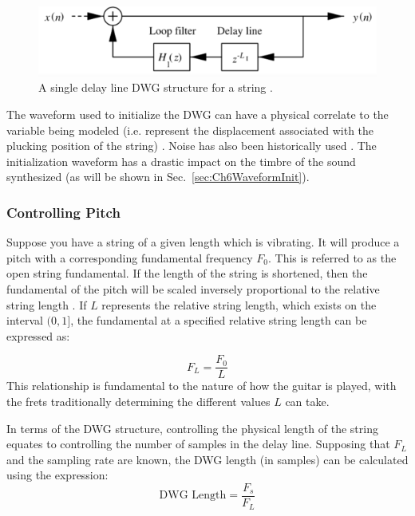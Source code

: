 \documentclass[main.tex]{subfiles}
\begin{document}
\begin{figure}[h]
    \centering
    \includegraphics[scale=1]{./images/diagrams/SDLModel.png}
    \caption{A single delay line DWG structure for a string .}
    \label{fig:SDLModel}
\end{figure}

The waveform used to initialize the DWG can have a physical correlate to
the variable being modeled (i.e. represent the displacement associated with the plucking position of the string) . Noise has also been historically used . The initialization waveform has a drastic impact on the timbre of the sound synthesized (as will be shown in Sec.~\ref{sec:Ch6WaveformInit}).

\subsubsection{Controlling Pitch}
Suppose you have a string of a given length which is vibrating. It will produce a pitch with a corresponding fundamental frequency $F_0$. This is referred to as the open string fundamental. If the length of the string is shortened, then the fundamental of the pitch will be scaled inversely proportional to the relative string length . If $L$ represents the relative string length, which exists on the interval $(0, 1]$, the fundamental at a specified relative string length can be expressed as:

\begin{equation}
    F_L = \frac{F_0}{L}
    \label{eq:F_L}
\end{equation}
This relationship is fundamental to the nature of how the guitar is played, with the frets traditionally determining the different values $L$ can take.

In terms of the DWG structure, controlling the physical length of the string equates to controlling the number of samples in the delay line. Supposing that $F_L$ and the sampling rate are known, the DWG length (in samples) can be calculated using the expression:
\begin{equation}
    \text{DWG Length} = \frac{F_s}{F_L}
\end{equation}
\end{document}
